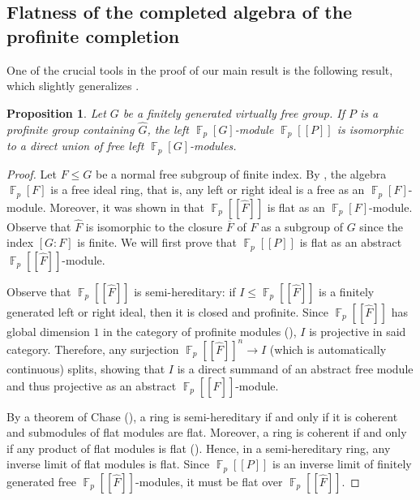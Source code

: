 \documentclass[a4paper]{amsart}
\newtheorem{pro}[lem]{Proposition}
\theoremstyle{definition}
\theoremstyle{remark}
\DeclareMathOperator{\bbf}{\mathbb{F}}
\newcommand{\Falgebra}[1]{\bbf_p[#1]}
\newcommand{\FFalgebra}[1]{\bbf_p[\![#1]\!]}
\begin{document}
\subsection{Flatness of the completed algebra of the profinite completion}

One of the crucial tools in the proof of our main result is the following result, which slightly generalizes \cite[Thm. 5.6]{garridoFreeFactorsProfinite2023}.

\begin{pro}\label{flatness} 
Let \(G\) be a finitely generated virtually free group. If \(P\) is a profinite group containing \(\widehat{G}\), the left \(\Falgebra{G}\)-module \(\FFalgebra{P}\) is isomorphic to a direct union of free left \(\Falgebra{G}\)-modules.
\end{pro}
\begin{proof} Let \(F \leq G\) be a normal free subgroup of finite index. By \cite[Cor. 7.11.8]{cohnFreeIdealRings2006}, the algebra \(\Falgebra{F}\) is a free ideal ring, that is, any left or right ideal is a free as an \(\Falgebra{F}\)-module. Moreover, it was shown in \cite[Prop. 5.3]{garridoFreeFactorsProfinite2023} that \(\FFalgebra{\widehat{F}}\) is flat as an \(\Falgebra{F}\)-module. Observe that \(\widehat{F}\) is isomorphic to the closure \(\overline{F}\) of \(F\) as a subgroup of \(G\) since the index \([G\colon F]\) is finite. We will first prove that \(\FFalgebra{P}\) is flat as an abstract \(\FFalgebra{\widehat{F}}\)-module.

Observe that $\FFalgebra{\widehat{F}}$ is semi-hereditary: if $I \leq \FFalgebra{\widehat{F}}$ is a finitely generated left or right ideal, then it is closed and profinite. Since \(\FFalgebra{\widehat{F}}\) has global dimension \(1\) in the category of profinite modules (\cite[Thm. 4.1]{brumerPseudocompactAlgebrasProfinite1966}), \(I\) is projective in said category. Therefore, any surjection \(\FFalgebra{\widehat{F}}^n \to I\) (which is automatically continuous) splits, showing that \(I\) is a direct summand of an abstract free module and thus projective as an abstract \(\FFalgebra{\widehat{F}}\)-module.

By a theorem of Chase (\cite[Thm. 4.32]{rotmanIntroductionHomologicalAlgebra2008}), a ring is semi-hereditary if and only if it is coherent and submodules of flat modules are flat. Moreover, a ring is coherent if and only if any product of flat modules is flat (\cite[Thm. 7.9]{rotmanIntroductionHomologicalAlgebra2008}). Hence, in a semi-hereditary ring, any inverse limit of flat modules is flat. Since \(\FFalgebra{P}\) is an inverse limit of finitely generated free \(\FFalgebra{\widehat{F}}\)-modules, it must be flat over \(\FFalgebra{\widehat{F}}\).


\end{proof}
\end{document}
